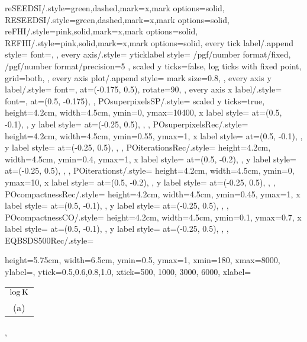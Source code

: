 {    reSEEDSI/.style={green,dashed,mark=x,mark options=solid},
    RESEEDSI/.style={green,dashed,mark=x,mark options=solid},
    reFHI/.style={pink,solid,mark=x,mark options=solid},
    REFHI/.style={pink,solid,mark=x,mark options=solid},
    every tick label/.append style={
        font=\scriptsize,
    },
    every axis/.style={
        yticklabel style={
            /pgf/number format/fixed,
            /pgf/number format/precision=5
        },
        scaled y ticks=false,
        log ticks with fixed point,
		grid=both,
    },
    every axis plot/.append style={
		mark size=0.8,
    },
    every axis y label/.style={
		font=\scriptsize,
		at={(-0.175, 0.5)},
		rotate=90,
    },
    every axis x label/.style={
    	font=\scriptsize,
		at={(0.5, -0.175)},
    },
    POsuperpixelsSP/.style={
    	scaled y ticks=true,
        height=4.2cm,
        width=4.5cm,
        ymin=0,
        ymax=10400,
        x label style={
    		at={(0.5, -0.1)},
        },
        y label style={
    		at={(-0.25, 0.5)},
        },
    },
    POsuperpixelsRec/.style={
        height=4.2cm,
        width=4.5cm,
        ymin=0.55,
        ymax=1,
        x label style={
    		at={(0.5, -0.1)},
        },
        y label style={
    		at={(-0.25, 0.5)},
        },
    },
    POiterationsRec/.style={
        height=4.2cm,
        width=4.5cm,
        ymin=0.4,
        ymax=1,
        x label style={
    		at={(0.5, -0.2)},
        },
        y label style={
    		at={(-0.25, 0.5)},
        },
    },
    POiterationst/.style={
        height=4.2cm,
        width=4.5cm,
        ymin=0,
        ymax=10,
        x label style={
    		at={(0.5, -0.2)},
        },
        y label style={
    		at={(-0.25, 0.5)},
        },
    },
    POcompactnessRec/.style={
        height=4.2cm,
        width=4.5cm,
        ymin=0.45,
        ymax=1,
        x label style={
    		at={(0.5, -0.1)},
        },
        y label style={
    		at={(-0.25, 0.5)},
        },
    },
    POcompactnessCO/.style={
        height=4.2cm,
        width=4.5cm,
        ymin=0.1,
        ymax=0.7,
        x label style={
    		at={(0.5, -0.1)},
        },
        y label style={
    		at={(-0.25, 0.5)},
        },
    },
    EQBSDS500Rec/.style={
        height=5.75cm,
        width=6.5cm,
        ymin=0.5,
        ymax=1,
        xmin=180,
        xmax=8000,
        ylabel=\Rec,
        ytick={0.5,0.6,0.8,1.0},
        xtick={500, 1000, 3000, 6000},
        xlabel=\begin{tabular}{c}$\log\text{K}$\\(a)\end{tabular},
}}
